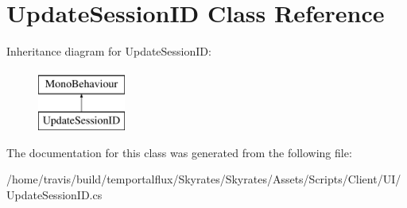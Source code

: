 \hypertarget{class_update_session_i_d}{\section{Update\-Session\-I\-D Class Reference}
\label{class_update_session_i_d}
}
Inheritance diagram for Update\-Session\-I\-D\-:\begin{figure}[H]
\begin{center}
\leavevmode
\includegraphics[height=2.000000cm]{class_update_session_i_d}
\end{center}
\end{figure}


The documentation for this class was generated from the following file\-:\begin{DoxyCompactItemize}
\item 
/home/travis/build/temportalflux/\-Skyrates/\-Skyrates/\-Assets/\-Scripts/\-Client/\-U\-I/Update\-Session\-I\-D.\-cs\end{DoxyCompactItemize}
